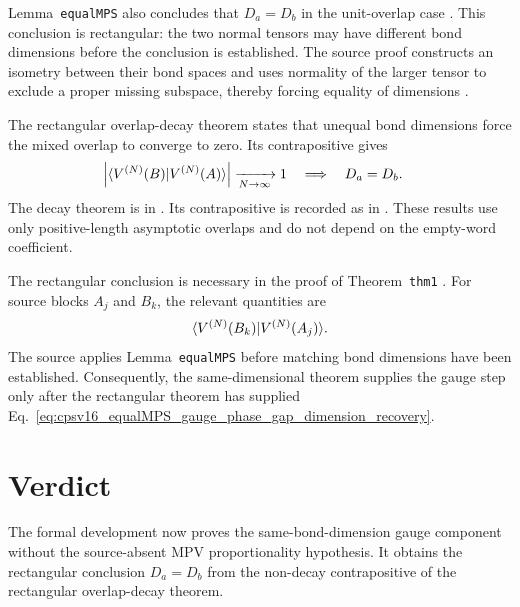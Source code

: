 \documentclass{article}
\begin{document}
Lemma~\texttt{equalMPS} also concludes that $D_a=D_b$ in the unit-overlap case
\cite[Lemma~\texttt{equalMPS}]{Cirac2016MPDO_arXiv}. This conclusion is
rectangular: the two normal tensors may have different bond dimensions before
the conclusion is established. The source proof constructs an isometry between
their bond spaces and uses normality of the larger tensor to exclude a proper
missing subspace, thereby forcing equality of dimensions
\cite[lines~1115--1117]{Cirac2016MPDO_arXiv}.

The rectangular overlap-decay theorem states that unequal bond dimensions
force the mixed overlap to converge to zero. Its contrapositive gives
\begin{align}
    \left|\langle V^{(N)}(B) | V^{(N)}(A) \rangle\right|
        \xrightarrow[N\to\infty]{}1
    \quad &\Longrightarrow\quad
    D_a=D_b.
    \label{eq:cpsv16_equalMPS_gauge_phase_gap_dimension_recovery}
\end{align}
The decay theorem is
in . Its contrapositive is
recorded as
in . These results use
only positive-length asymptotic overlaps and do not depend on the empty-word
coefficient.

The rectangular conclusion is necessary in the proof of
Theorem~\texttt{thm1}
\cite[statement lines~1167--1170; proof line~1182]{Cirac2016MPDO_arXiv}.
For source blocks $A_j$ and $B_k$, the relevant quantities are
\begin{align}
    \langle V^{(N)}(B_k) | V^{(N)}(A_j) \rangle.
    \label{eq:cpsv16_equalMPS_gauge_phase_gap_block_overlap}
\end{align}
The source applies Lemma~\texttt{equalMPS} before matching bond dimensions
have been established. Consequently, the same-dimensional theorem supplies
the gauge step only after the rectangular theorem has supplied
Eq.~\ref{eq:cpsv16_equalMPS_gauge_phase_gap_dimension_recovery}.

\section{Verdict}

The formal development now proves the same-bond-dimension gauge component
without the source-absent MPV proportionality hypothesis. It obtains the
rectangular conclusion $D_a=D_b$ from the non-decay contrapositive of the
rectangular overlap-decay theorem.
\end{document}
